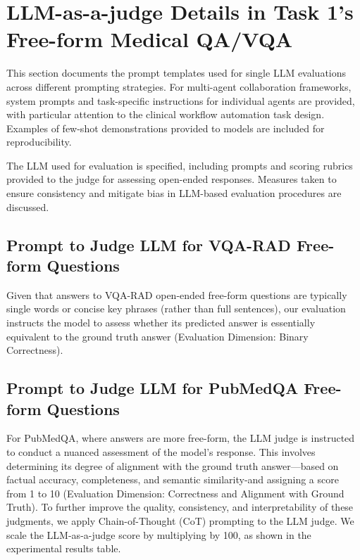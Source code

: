 \documentclass{article}
\begin{document}
\section{LLM-as-a-judge Details in Task 1's Free-form Medical QA/VQA}
\label{sec:app_llm_judge_task1}

This section documents the prompt templates used for single LLM evaluations across different prompting strategies. For multi-agent collaboration frameworks, system prompts and task-specific instructions for individual agents are provided, with particular attention to the clinical workflow automation task design. Examples of few-shot demonstrations provided to models are included for reproducibility.

The LLM used for evaluation is specified, including prompts and scoring rubrics provided to the judge for assessing open-ended responses. Measures taken to ensure consistency and mitigate bias in LLM-based evaluation procedures are discussed.

\subsection{Prompt to Judge LLM for VQA-RAD Free-form Questions}
\label{sec:app_prompt_vqa_rad_judge}
Given that answers to VQA-RAD open-ended free-form questions are typically single words or concise key phrases (rather than full sentences), our evaluation instructs the model to assess whether its predicted answer is essentially equivalent to the ground truth answer (Evaluation Dimension: Binary Correctness).



\subsection{Prompt to Judge LLM for PubMedQA Free-form Questions}
\label{sec:app_prompt_pubmedqa_judge}
For PubMedQA, where answers are more free-form, the LLM judge is instructed to conduct a nuanced assessment of the model's response. This involves determining its degree of alignment with the ground truth answer—based on factual accuracy, completeness, and semantic similarity-and assigning a score from 1 to 10 (Evaluation Dimension: Correctness and Alignment with Ground Truth). To further improve the quality, consistency, and interpretability of these judgments, we apply Chain-of-Thought (CoT) prompting to the LLM judge. We scale the LLM-as-a-judge score by multiplying by 100, as shown in the experimental results table.
\end{document}
